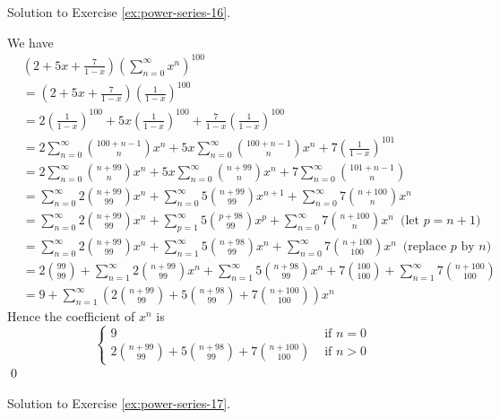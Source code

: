 \newpage

Solution to Exercise \ref{ex:power-series-16}.


We have
\begin{align*}
&\left( 
2 + 5x + \frac{7}{1 - x}
\right)
\left( \sum_{n=0}^\infty x^n \right)^{100}
\\
&= \left( 
2 + 5x + \frac{7}{1 - x}
\right)
\left( \frac{1}{1 - x} \right)^{100}
\\
&=
2\left( \frac{1}{1 - x} \right)^{100}
+ 5x \left( \frac{1}{1 - x} \right)^{100}
+ \frac{7}{1 - x} \left( \frac{1}{1 - x} \right)^{100}
\\
&=
2 \sum_{n=0}^\infty \binom{100 + n - 1}{n} x^n
+ 5x \sum_{n=0}^\infty \binom{100 + n - 1}{n} x^n
+ 7 \left( \frac{1}{1 - x} \right)^{101} 
\\
&=
2 \sum_{n=0}^\infty \binom{n + 99}{n} x^n
+ 5x \sum_{n=0}^\infty \binom{n + 99}{n} x^n
+ 7 \sum_{n=0}^\infty \binom{101 + n - 1}{n}
\\
&=
\sum_{n=0}^\infty 2 \binom{n + 99}{99} x^n
+ \sum_{n=0}^\infty 5 \binom{n + 99}{99} x^{n+1}
+ \sum_{n=0}^\infty 7 \binom{n + 100}{n} x^n
\\
&=
\sum_{n=0}^\infty 2 \binom{n + 99}{99} x^n
+ \sum_{p=1}^\infty 5 \binom{p + 98}{99} x^{p}
+ \sum_{n=0}^\infty 7          \binom{n + 100}{n} x^n  \,\,\, \text{(let $p = n + 1$)}
\\
&=
\sum_{n=0}^\infty 2\binom{n + 99}{99} x^n
+ \sum_{n=1}^\infty 5 \binom{n + 98}{99} x^{n}  
+ \sum_{n=0}^\infty 7 \binom{n + 100}{100} x^n \,\,\,\text{(replace $p$ by $n$)}
\\
&=
2 \binom{99}{99} + \sum_{n=1}^\infty 2\binom{n + 99}{99} x^n
+ \sum_{n=1}^\infty 5\binom{n + 98}{99} x^{n} 
+ 7\binom{100}{100}  + \sum_{n=1}^\infty 7 \binom{n + 100}{100}  
\\
&=
9 +
\sum_{n=1}^\infty
\left( 2\binom{n + 99}{99} 
+  5\binom{n + 98}{99} 
+ 7 \binom{n + 100}{100}
\right) x^n
\end{align*}
Hence the coefficient of $x^n$ is
\[
\begin{cases}
9 & \text{ if } n = 0 \\
\displaystyle 2\binom{n + 99}{99} 
+  5\binom{n + 98}{99} 
+ 7 \binom{n + 100}{100} & \text{ if } n > 0
\end{cases}
\]
\qed


\newpage

Solution to Exercise \ref{ex:power-series-17}.

